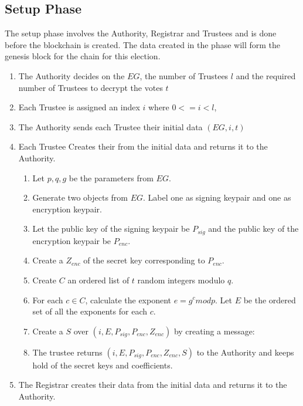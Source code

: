 \subsection{Setup Phase}
\label{ch:astris:detail:setup}

The setup phase involves the Authority, Registrar and Trustees and is done before the blockchain is created. The data created in the phase will form the genesis block for the chain for this election.

\begin{enumerate}
    \item The Authority decides on the  $EG$, the number of Trustees $l$ and the required number of Trustees to decrypt the votes $t$
    \item Each Trustee is assigned an index $i$ where $0 <= i < l$,
    \item The Authority sends each Trustee their initial data $(EG, i, t)$
    \item Each Trustee Creates their  from the initial data and returns it to the Authority.
          \begin{enumerate}
              \item Let $p,q,g$ be the parameters from $EG$.
              \item Generate two  objects from $EG$. Label one as signing keypair and one as encryption keypair.
              \item Let the public key of the signing keypair be $P_{sig}$ and the public key of the encryption keypair be $P_{enc}$.
              \item Create a  $Z_{enc}$ of the secret key corresponding to $P_{enc}$.
              \item Create $C$ an ordered list of $t$ random integers modulo $q$.
              \item For each $c \in C$, calculate the exponent $e = g^c mod p$. Let $E$ be the ordered set of all the exponents for each $c$.
              \item Create a  $S$ over $(i, E, P_{sig}, P_{enc}, Z_{enc})$ by creating a message: 
              \item The trustee returns $(i, E, P_{sig}, P_{enc}, Z_{enc}, S)$ to the Authority and keeps hold of the secret keys and coefficients.
          \end{enumerate}
    \item The Registrar creates their  data from the initial data and returns it to the Authority.

\end{enumerate}
